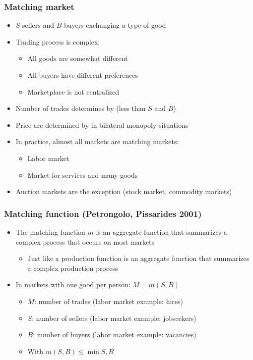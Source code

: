 \documentclass[11pt,aspectratio=169,xcolor={dvipsnames},hyperref={pdftex,pdfpagemode=UseNone,hidelinks,pdfdisplaydoctitle=true},usepdftitle=false]{beamer}
\begin{document}
\begin{frame}
\frametitle{Matching market}
\begin{itemize}
\item $S$ sellers and $B$ buyers exchanging a type of good
\item Trading process is complex:
\begin{itemize}
	\item All goods are somewhat different
	\item All buyers have different preferences
	\item Marketplace is not centralized
\end{itemize}
\item Number of trades determines by  (less than $S$ and $B$)
\item Price are determined by  in bilateral-monopoly situations
\item In practice, almost all markets are matching markets:
\begin{itemize}
	\item Labor market
	\item Market for services and many goods
\end{itemize}
 \item Auction markets are the exception (stock market, commodity markets)
\end{itemize}	
\end{frame}

\begin{frame}
\frametitle{Matching function (Petrongolo, Pissarides 2001)}
\begin{itemize}
\item The matching function $m$ is an aggregate function that summarizes a complex process that occurs on most markets
\begin{itemize}
	\item Just like a production function is an aggregate function that summarizes a complex production process
\end{itemize}
\item In markets with one good per person: $M = m(S,B)$
\begin{itemize}
	\item $M$: number of trades (labor market example: hires)
	\item $S$: number of sellers (labor market example: jobseekers)
	\item $B$: number of buyers (labor market example: vacancies)
	\item With $m(S,B) \leq \min{S,B}$
\end{itemize}
\end{itemize}	
\end{frame}
\end{document}
